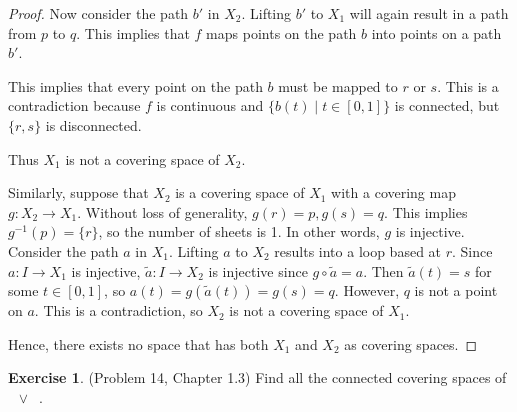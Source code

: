 \documentclass[12pt, psamsfonts]{amsart}
\theoremstyle{definition}
\newtheorem*{exer}{Exercise}
\theoremstyle{remark}
\DeclareMathOperator{\RP}{\mathbb{R}\mathbf{P}^2}
\numberwithin{equation}{section}
\begin{document}
\begin{proof}
  Now consider the path $b'$ in $X_2$.
  Lifting $b'$ to $X_1$ will again result in a path from $p$ to $q$.
  This implies that $f$ maps points on the path $b$ into points on a path $b'$.

  This implies that every point on the path $b$ must be mapped to $r$ or $s$.
  This is a contradiction because $f$ is continuous and $\{ b(t) \mid t \in [0, 1] \}$ is connected, but $\{ r, s \}$ is disconnected.

  Thus $X_1$ is not a covering space of $X_2$.

  Similarly, suppose that $X_2$ is a covering space of $X_1$ with a covering map $g: X_2 \rightarrow X_1$.
  Without loss of generality, $g(r) = p, g(s) = q$.
  This implies $g^{-1}(p) = \{ r \}$, so the number of sheets is 1.
  In other words, $g$ is injective.
  Consider the path $a$ in $X_1$.
  Lifting $a$ to $X_2$ results into a loop based at $r$.
  Since $a: I \rightarrow X_1$ is injective, $\tilde{a}: I \rightarrow X_2$ is injective since $g \circ \tilde{a} = a$.
  Then $\tilde{a}(t) = s$ for some $t \in [0, 1]$, so $a(t) = g(\tilde{a}(t)) = g(s) = q$.
  However, $q$ is not a point on $a$.
  This is a contradiction, so $X_2$ is not a covering space of $X_1$.

  Hence, there exists no space that has both $X_1$ and $X_2$ as covering spaces.
\end{proof}

\begin{exer}{(Problem 14, Chapter 1.3)}
  Find all the connected covering spaces of $\RP \vee \RP$.
\end{exer}
\end{document}
